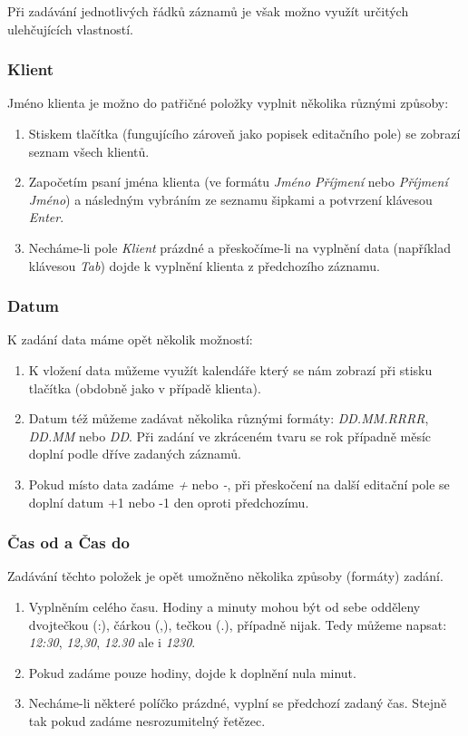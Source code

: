 \documentclass[12pt]{article}
\newcommand{\tl}[1]{\frame{#1}}
\newcommand{\kl}[1]{\emph{#1}}
\begin{document}
Při zadávání jednotlivých řádků záznamů je však možno využít určitých ulehčujících vlastností.
\subsubsection{Klient}
Jméno klienta je možno do patřičné položky vyplnit několika různými způsoby:
\begin{enumerate}
  \item Stiskem tlačítka \tl{Klient} (fungujícího zároveň jako popisek editačního pole) se zobrazí
    seznam všech klientů.
  \item Započetím psaní jména klienta (ve formátu \emph{Jméno Příjmení} nebo \emph{Příjmení Jméno})
    a následným vybráním ze seznamu šipkami a potvrzení klávesou \kl{Enter}.
  \item Necháme-li pole \emph{Klient} prázdné a přeskočíme-li na vyplnění data (například klávesou
    \kl{Tab}) dojde k vyplnění klienta z předchozího záznamu.
\end{enumerate}

\subsubsection{Datum}
K zadání data máme opět několik možností:
\begin{enumerate}
  \item K vložení data můžeme využít kalendáře který se nám zobrazí při stisku tlačítka \tl{Datum}
    (obdobně jako v případě klienta).
  \item Datum též můžeme zadávat několika různými formáty: \emph{DD.MM.RRRR}, \emph{DD.MM} nebo
    \emph{DD}. Při zadání ve zkráceném tvaru se rok případně měsíc doplní podle dříve zadaných
    záznamů.
  \item Pokud místo data zadáme \emph{+} nebo \emph{-}, při přeskočení na další editační pole se
    doplní datum +1 nebo -1 den oproti předchozímu.
\end{enumerate}

\subsubsection{Čas od a Čas do}
Zadávání těchto položek je opět umožněno několika způsoby (formáty) zadání.
\begin{enumerate}
  \item Vyplněním celého času. Hodiny a minuty mohou být od sebe odděleny dvojtečkou (:), čárkou
    (,), tečkou (.), případně nijak. Tedy můžeme napsat: \emph{12:30}, \emph{12,30}, \emph{12.30} ale
    i \emph{1230}.
  \item Pokud zadáme pouze hodiny, dojde k doplnění nula minut.
  \item Necháme-li některé políčko prázdné, vyplní se předchozí zadaný čas. Stejně tak pokud zadáme
    nesrozumitelný řetězec.
\end{enumerate}
\end{document}
